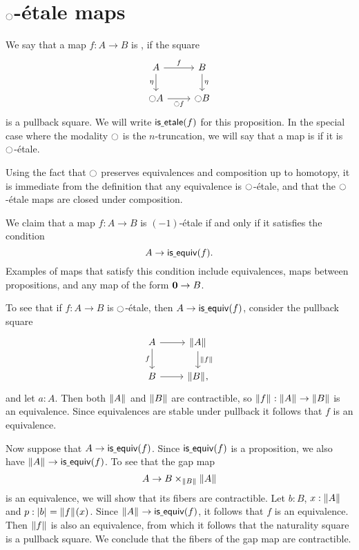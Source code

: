 \documentclass[9pt,twosided]{amsart}
\begin{document}
\section{\texorpdfstring{${\ocircle}$}{○}-\'etale maps}

\begin{defn}
We say that a map $f:A\to B$ is , if the square
\begin{equation*}
\begin{tikzcd}
A \arrow[r,"f"] \arrow[d,swap,"\eta"] & B \arrow[d,"\eta"] \\
\modal A \arrow[r,swap,"\modal f"] & \modal B
\end{tikzcd}
\end{equation*}
is a pullback square. We will write $\mathsf{is\underline{\ }{}etale}(f)$ for this proposition. In the special case where the modality ${\ocircle}$ is the $n$-truncation, we will say that a map is  if it is ${\ocircle}$-\'etale.
\end{defn}

Using the fact that ${\ocircle}$ preserves equivalences and composition up to homotopy,
it is immediate from the definition that any equivalence is ${\ocircle}$-\'etale, and that the ${\ocircle}$-\'etale maps are closed under composition.

\begin{eg}\label{eg:etale_prop}
  We claim that a map $f:A\to B$ is $(-1)$-\'etale if and only if it satisfies the condition
  \begin{equation*}
    A\to \mathsf{is\underline{\ }{}equiv}(f).
  \end{equation*}
  Examples of maps that satisfy this condition include equivalences, maps between propositions, and any map of the form $\mathbf{0}\to B$.

To see that if $f:A\to B$ is ${\ocircle}$-\'etale, then $A\to\mathsf{is\underline{\ }{}equiv}(f)$, consider the pullback square
\begin{equation*}
\begin{tikzcd}
A \arrow[r] \arrow[d,swap,"f"] & \brck{A} \arrow[d,"\brck{f}"] \\
B \arrow[r] & \brck{B},
\end{tikzcd}
\end{equation*}
and let $a:A$. Then both $\brck{A}$ and $\brck{B}$ are contractible, so $\brck{f}:\brck{A}\to\brck{B}$ is an equivalence. Since equivalences are stable under pullback it follows that $f$ is an equivalence.

Now suppose that $A\to \mathsf{is\underline{\ }{}equiv}(f)$. Since $\mathsf{is\underline{\ }{}equiv}(f)$ is a proposition, we also have $\brck{A}\to\isequiv(f)$. To see that the gap map
\begin{equation*}
A \to B\times_{\brck{B}}\brck{A}
\end{equation*}
is an equivalence, we will show that its fibers are contractible. Let $b:B$, $x:\brck{A}$ and $p:\bproj{b}=\brck{f}(x)$. Since $\brck{A}\to\isequiv(f)$, it follows that $f$ is an equivalence. Then $\brck{f}$ is also an equivalence, from which it follows that the naturality square is a pullback square. We conclude that the fibers of the gap map are contractible. 
\end{eg}
\end{document}
